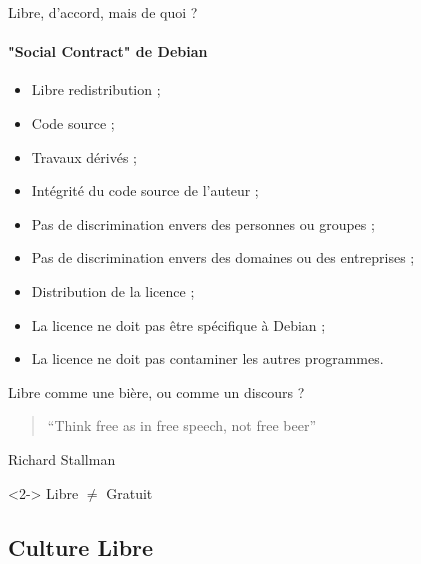 \begin{frame}{Libre, d'accord, mais de quoi ?}
  \framesubtitle{"Social Contract" de Debian\footnotemark[1]}

  \begin{itemize}\small
    \item Libre redistribution ;
    \item Code source ;
    \item Travaux dérivés ;
    \item Intégrité du code source de l'auteur ;
    \item Pas de discrimination envers des personnes ou groupes ;
    \item Pas de discrimination envers des domaines ou des entreprises ;
    \item Distribution de la licence ;
    \item La licence ne doit pas être spécifique à Debian ;
    \item La licence ne doit pas contaminer les autres programmes.
  \end{itemize}

\end{frame}

\begin{frame}{Libre comme une bière, ou comme un discours ?}
  \begin{quote}\centering
    ``Think free as in free speech, not free beer''
  \end{quote}
  \begin{flushright}
    Richard Stallman
  \end{flushright}

  \begin{alertblock}<2->{}\centering
    Libre $\neq$ Gratuit
  \end{alertblock}
\end{frame}

\subsection{Culture Libre}

